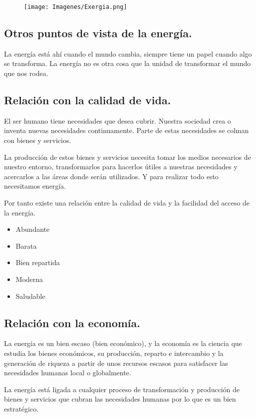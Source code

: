 \begin{figure}[h]
    \centering
    \texttt{[image: Imagenes/Exergia.png]}
\end{figure}

\subsection{Otros puntos de vista de la energía.}
La energía está ahí cuando el mundo cambia, siempre tiene un papel cuando algo se transforma. La energía no es otra cosa que la unidad de transformar el mundo que nos rodea.

\subsection{Relación con la calidad de vida.}
El ser humano tiene necesidades que desea cubrir. Nuestra sociedad crea o inventa nuevas necesidades continuamente. Parte de estas necesidades se colman con bienes y servicios.

La producción de estos bienes y servicios necesita tomar los medios necesarios de nuestro entorno, transformarlos para hacerlos útiles a nuestras necesidades y acercarlos a las áreas donde serán utilizados. Y para realizar todo esto necesitamos energía.

Por tanto existe una relación entre la calidad de vida y la facilidad del acceso de la energía.
\begin{itemize}
    \item Abundante
    \item Barata
    \item Bien repartida
    \item Moderna
    \item Saludable
\end{itemize}

\subsection{Relación con la economía.}
La energía es un bien escaso (bien económico), y la economía es la ciencia que estudia los bienes económicos, su producción, reparto e intercambio y la generación de riqueza a partir de unos recursos escasos para satisfacer las necesidades humanas local o globalmente.

La energía está ligada a cualquier proceso de transformación y producción de bienes y servicios que cubran las necesidades humanas por lo que es un bien estratégico.

